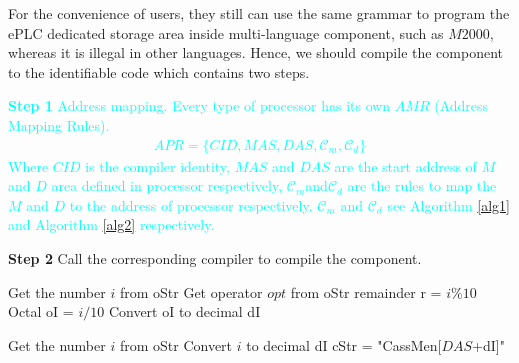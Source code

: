 \documentclass[journal,UTF8]{IEEEtran}
\begin{document}
 For the convenience of users, they still can use the same grammar to program the ePLC dedicated storage area inside multi-language component, such as $M2000$, whereas it is illegal in other languages. Hence, we should compile the component to the identifiable code which contains two steps. 
 	
 \textcolor{cyan}{\textbf{Step 1} Address mapping. Every type of processor has its own $AMR$ (Address Mapping Rules).
 \begin{eqnarray}
  APR = \{CID,MAS,DAS,\mathcal{C}_m, \mathcal{C}_d\}
 \end{eqnarray}
 Where $CID$ is the compiler identity, $MAS$ and $DAS$ are the start address of $M$ and $D$ area defined in processor respectively, $\mathcal{C}_m$and$\mathcal{C}_d$ are the rules to map the $M$ and $D$ to  the address of processor respectively. $\mathcal{C}_m$ and $ \mathcal{C}_d$ see Algorithm \ref{alg1} and Algorithm \ref{alg2} respectively.}
 
\textbf{Step 2} Call the corresponding compiler to compile the component.


\begin{algorithm}
	\label{alg1}
	\caption{$\mathcal{C}_m$}%
	Get the number $i$ from oStr\; 
	Get operator $opt$ from oStr\;
	remainder r = $i\%10$\;
	Octal oI =  $i/10$\;
	Convert oI to decimal dI\; 
\end{algorithm}
\begin{algorithm}
	\label{alg2}
	\caption{$\mathcal{C}_d$}%
	Get the number $i$ from oStr\; 
	Convert $i$ to decimal dI\; 
	cStr = "CassMen[$DAS$+dI]"\;
\end{algorithm}
\end{document}
